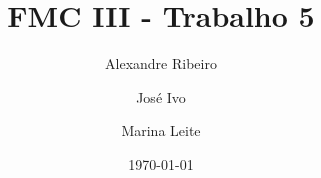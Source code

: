 \documentclass[12pt]{article}
\begin{document}
\title{FMC III - Trabalho 5}
\author{Alexandre Ribeiro \and José Ivo \and Marina Leite}
\date{\today}

\maketitle




\end{document}

